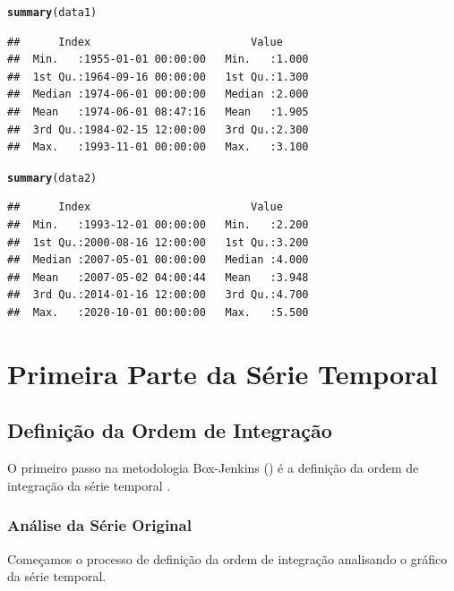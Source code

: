 \documentclass{article}\usepackage[]{graphicx}\usepackage[]{color}
\makeatletter
\newcommand{\hlstd}[1]{\textcolor[rgb]{0.345,0.345,0.345}{#1}}%
\newcommand{\hlkwd}[1]{\textcolor[rgb]{0.737,0.353,0.396}{\textbf{#1}}}%
\newenvironment{kframe}{%
 \def\at@end@of@kframe{}%
 \ifinner\ifhmode%
  \def\at@end@of@kframe{\end{minipage}}%
  \begin{minipage}{\columnwidth}%
 \fi\fi%
 \def\FrameCommand##1{\hskip\@totalleftmargin \hskip-\fboxsep
 \colorbox{shadecolor}{##1}\hskip-\fboxsep
     \hskip-\linewidth \hskip-\@totalleftmargin \hskip\columnwidth}%
 \MakeFramed {\advance\hsize-\width
   \@totalleftmargin\z@ \linewidth\hsize
   \@setminipage}}%
 {\par\unskip\endMakeFramed%
 \at@end@of@kframe}
\newenvironment{knitrout}{}{} %
\makeatother
\begin{document}
\begin{knitrout}
\color{fgcolor}\begin{kframe}
\begin{alltt}
\hlkwd{summary}\hlstd{(data1)}
\end{alltt}
\begin{verbatim}
##      Index                         Value      
##  Min.   :1955-01-01 00:00:00   Min.   :1.000  
##  1st Qu.:1964-09-16 00:00:00   1st Qu.:1.300  
##  Median :1974-06-01 00:00:00   Median :2.000  
##  Mean   :1974-06-01 08:47:16   Mean   :1.905  
##  3rd Qu.:1984-02-15 12:00:00   3rd Qu.:2.300  
##  Max.   :1993-11-01 00:00:00   Max.   :3.100
\end{verbatim}
\begin{alltt}
\hlkwd{summary}\hlstd{(data2)}
\end{alltt}
\begin{verbatim}
##      Index                         Value      
##  Min.   :1993-12-01 00:00:00   Min.   :2.200  
##  1st Qu.:2000-08-16 12:00:00   1st Qu.:3.200  
##  Median :2007-05-01 00:00:00   Median :4.000  
##  Mean   :2007-05-02 04:00:44   Mean   :3.948  
##  3rd Qu.:2014-01-16 12:00:00   3rd Qu.:4.700  
##  Max.   :2020-10-01 00:00:00   Max.   :5.500
\end{verbatim}
\end{kframe}
\end{knitrout}



\section{Primeira Parte da Série Temporal}

    \subsection{Definição da Ordem de Integração}
    
        O primeiro passo na metodologia Box-Jenkins (\cite{boxjenkins}) é a definição da ordem de integração da série temporal .
    
        \subsubsection{Análise da Série Original}
        
            Começamos o processo de definição da ordem de integração analisando o gráfico da série temporal.
        
\end{document}
